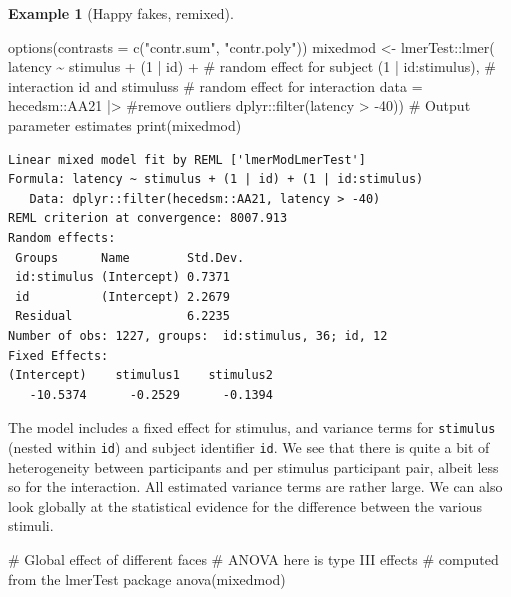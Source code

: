 \documentclass[
  11pt,
  letterpaper,
]{scrbook}
\newenvironment{Shaded}{\begin{snugshade}}{\end{snugshade}}
\newcommand{\AttributeTok}[1]{\textcolor[rgb]{0.40,0.45,0.13}{#1}}
\newcommand{\CommentTok}[1]{\textcolor[rgb]{0.37,0.37,0.37}{#1}}
\newcommand{\DecValTok}[1]{\textcolor[rgb]{0.68,0.00,0.00}{#1}}
\newcommand{\FunctionTok}[1]{\textcolor[rgb]{0.28,0.35,0.67}{#1}}
\newcommand{\NormalTok}[1]{\textcolor[rgb]{0.00,0.23,0.31}{#1}}
\newcommand{\OtherTok}[1]{\textcolor[rgb]{0.00,0.23,0.31}{#1}}
\newcommand{\SpecialCharTok}[1]{\textcolor[rgb]{0.37,0.37,0.37}{#1}}
\newcommand{\StringTok}[1]{\textcolor[rgb]{0.13,0.47,0.30}{#1}}
\theoremstyle{definition}
\theoremstyle{definition}
\newtheorem{example}{Example}[chapter]
\theoremstyle{remark}
\begin{document}
\begin{example}[Happy fakes,
remixed]
\begin{Shaded}
\begin{Highlighting}[]
\FunctionTok{options}\NormalTok{(}\AttributeTok{contrasts =} \FunctionTok{c}\NormalTok{(}\StringTok{"contr.sum"}\NormalTok{, }\StringTok{"contr.poly"}\NormalTok{))}
\NormalTok{mixedmod }\OtherTok{\textless{}{-}}\NormalTok{ lmerTest}\SpecialCharTok{::}\FunctionTok{lmer}\NormalTok{(}
\NormalTok{  latency }\SpecialCharTok{\textasciitilde{}}\NormalTok{ stimulus }\SpecialCharTok{+} 
\NormalTok{    (}\DecValTok{1} \SpecialCharTok{|}\NormalTok{ id) }\SpecialCharTok{+} \CommentTok{\# random effect for subject}
\NormalTok{    (}\DecValTok{1} \SpecialCharTok{|}\NormalTok{ id}\SpecialCharTok{:}\NormalTok{stimulus), }\CommentTok{\# interaction id and stimuluss}
  \CommentTok{\# random effect for interaction }
  \AttributeTok{data =}\NormalTok{ hecedsm}\SpecialCharTok{::}\NormalTok{AA21 }\SpecialCharTok{|\textgreater{}} \CommentTok{\#remove outliers}
\NormalTok{    dplyr}\SpecialCharTok{::}\FunctionTok{filter}\NormalTok{(latency }\SpecialCharTok{\textgreater{}} \SpecialCharTok{{-}}\DecValTok{40}\NormalTok{))}
\CommentTok{\# Output parameter estimates}
\FunctionTok{print}\NormalTok{(mixedmod)}
\end{Highlighting}
\end{Shaded}

\begin{verbatim}
Linear mixed model fit by REML ['lmerModLmerTest']
Formula: latency ~ stimulus + (1 | id) + (1 | id:stimulus)
   Data: dplyr::filter(hecedsm::AA21, latency > -40)
REML criterion at convergence: 8007.913
Random effects:
 Groups      Name        Std.Dev.
 id:stimulus (Intercept) 0.7371  
 id          (Intercept) 2.2679  
 Residual                6.2235  
Number of obs: 1227, groups:  id:stimulus, 36; id, 12
Fixed Effects:
(Intercept)    stimulus1    stimulus2  
   -10.5374      -0.2529      -0.1394  
\end{verbatim}

The model includes a fixed effect for stimulus, and variance terms for
\texttt{stimulus} (nested within \texttt{id}) and subject identifier
\texttt{id}. We see that there is quite a bit of heterogeneity between
participants and per stimulus participant pair, albeit less so for the
interaction. All estimated variance terms are rather large. We can also
look globally at the statistical evidence for the difference between the
various stimuli.

\begin{Shaded}
\begin{Highlighting}[]
\CommentTok{\# Global effect of different faces}
\CommentTok{\# ANOVA here is type III effects }
\CommentTok{\# computed from the \textquotesingle{}lmerTest\textquotesingle{} package}
\FunctionTok{anova}\NormalTok{(mixedmod)}
\end{Highlighting}
\end{Shaded}


\end{example}
\end{document}
